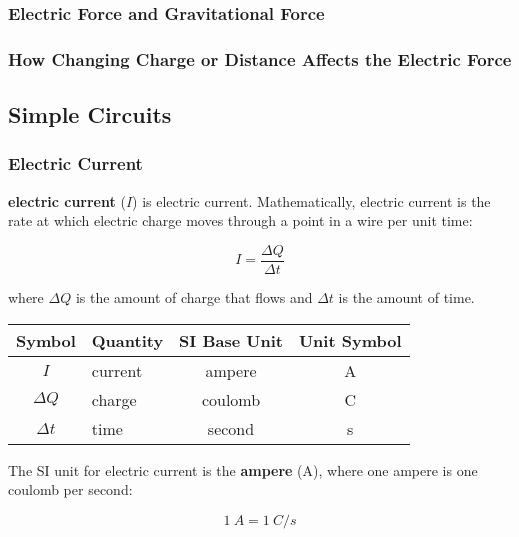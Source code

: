 \documentclass[dvipsnames]{article}
\begin{document}
\subsubsection{Electric Force and Gravitational Force}

\subsubsection{How Changing Charge or Distance Affects the Electric Force}


\clearpage

\subsection{Simple Circuits}

\subsubsection*{Electric Current}

\textbf{\Gls{electric current}} ($I$) is \glsdesc{electric current}. Mathematically, electric current is the rate at which electric charge moves through a point in a wire per unit time:

\begin{equation} \label{JzFlJp}
    I = \frac{\Delta Q}{\Delta t}
\end{equation}

where $\Delta{Q}$ is the amount of charge that flows and $\Delta{t}$ is the amount of time.

\begin{center}
    \begin{tabular}{cl|cc}
    \hline
    \textbf{Symbol} & \textbf{Quantity} & \textbf{SI Base Unit} & \textbf{Unit Symbol}  \\
    \hline\hline
    \rule{0pt}{2.5ex}
        $I$ & current & ampere & A\\
        $\Delta{Q}$ & charge & coulomb & C\\
        $\Delta{t}$ & time & second & s\\
    \hline
    \end{tabular}
\end{center}

 The SI unit for electric current is the \textbf{ampere} (A), where one ampere is one coulomb per second:

\begin{equation*}
    \SI{1}{A} = \SI{1}{C/s}
\end{equation*}
\end{document}
